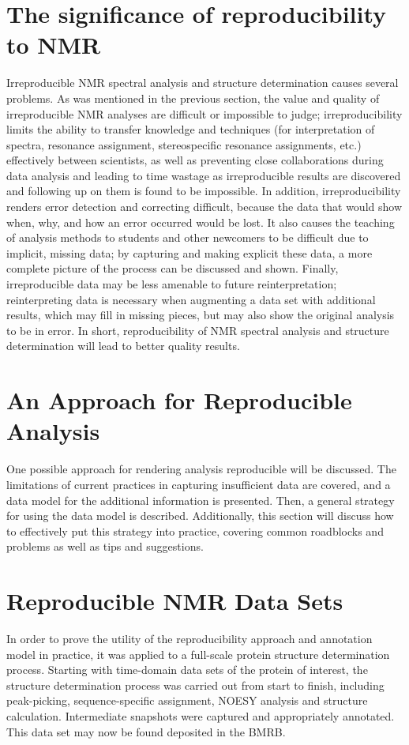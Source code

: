 \section{The significance of reproducibility to NMR}
Irreproducible NMR spectral analysis and structure determination causes 
several problems.  As was mentioned in the previous section, the value and 
quality of irreproducible NMR analyses are difficult or impossible to judge; 
irreproducibility limits the ability to transfer knowledge and techniques 
(for interpretation of spectra, resonance assignment, stereospecific resonance 
assignments, etc.) effectively between scientists, as well as preventing close 
collaborations during data analysis and leading to time wastage as 
irreproducible results are discovered and following up on them is found to be 
impossible.  In addition, irreproducibility renders error detection and 
correcting difficult, because the data that would show when, why, and how an 
error occurred would be lost.  It also causes the teaching of analysis methods 
to students and other newcomers to be difficult due to implicit, missing data; 
by capturing and making explicit these data, a more complete picture of the 
process can be discussed and shown.  Finally, irreproducible data may be less 
amenable to future reinterpretation; reinterpreting data is necessary when 
augmenting a data set with additional results, which may fill in missing 
pieces, but may also show the original analysis to be in error.  In short, 
reproducibility of NMR spectral analysis and structure determination will lead 
to better quality results.


\section{An Approach for Reproducible Analysis}
One possible approach for rendering analysis reproducible will be discussed.
The limitations of current practices in capturing insufficient data are 
covered, and a data model for the additional information is presented.
Then, a general strategy for using the data model is described.
Additionally, this section will discuss how to effectively put this strategy 
into practice, covering common roadblocks and problems as well as tips and 
suggestions.


\section{Reproducible NMR Data Sets}
In order to prove the utility of the reproducibility approach and annotation 
model in practice, it was applied to a full-scale protein structure 
determination process.  Starting with time-domain data sets of the protein of 
interest, the structure determination process was carried out from start to 
finish, including peak-picking, sequence-specific assignment, NOESY analysis 
and structure calculation.  Intermediate snapshots were captured and 
appropriately annotated.  This data set may now be found deposited in the BMRB.

